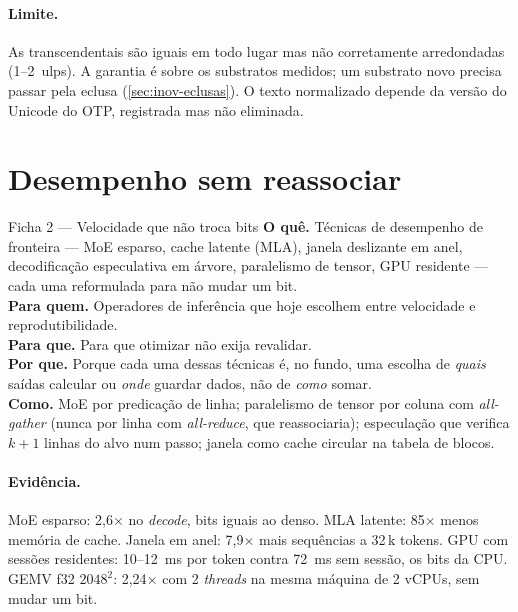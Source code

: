 \paragraph{Limite.} As transcendentais são iguais em todo lugar mas não corretamente arredondadas (1--2~ulps). A garantia é sobre os substratos medidos; um substrato novo precisa passar pela eclusa (\autoref{sec:inov-eclusas}). O texto normalizado depende da versão do Unicode do OTP, registrada mas não eliminada.

\section{Desempenho sem reassociar}\label{sec:inov-desempenho}

\begin{ficha}{Ficha 2 --- Velocidade que não troca bits}
\textbf{O quê.} Técnicas de desempenho de fronteira --- MoE esparso, cache latente (MLA), janela deslizante em anel, decodificação especulativa em árvore, paralelismo de tensor, GPU residente --- cada uma reformulada para não mudar um bit.\\
\textbf{Para quem.} Operadores de inferência que hoje escolhem entre velocidade e reprodutibilidade.\\
\textbf{Para que.} Para que otimizar não exija revalidar.\\
\textbf{Por que.} Porque cada uma dessas técnicas é, no fundo, uma escolha de \emph{quais} saídas calcular ou \emph{onde} guardar dados, não de \emph{como} somar.\\
\textbf{Como.} MoE por predicação de linha; paralelismo de tensor por coluna com \textit{all-gather} (nunca por linha com \textit{all-reduce}, que reassociaria); especulação que verifica $k+1$ linhas do alvo num passo; janela como cache circular na tabela de blocos.
\end{ficha}

\paragraph{Evidência.} MoE esparso: 2,6$\times$ no \textit{decode}, bits iguais ao denso. MLA latente: 85$\times$ menos memória de cache. Janela em anel: 7,9$\times$ mais sequências a 32\,k tokens. GPU com sessões residentes: 10--12~ms por token contra 72~ms sem sessão, os bits da CPU. GEMV f32 $2048^2$: 2,24$\times$ com 2 \textit{threads} na mesma máquina de 2 vCPUs, sem mudar um bit.

